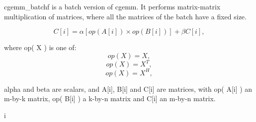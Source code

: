cgemm\+\_\+batchf is a batch version of cgemm. It performs matrix-\/matrix multiplication of matrices, where all the matrices of the batch have a fixed size.

\[ C[i] = \alpha [op( A[i] )\times op( B[i] )] + \beta C[i], \]

where op( X ) is one of\+: \[ op( X ) = X, \] \[ op( X ) = X^T, \] \[ op( X ) = X^H, \]

alpha and beta are scalars, and A\mbox{[}i\mbox{]}, B\mbox{[}i\mbox{]} and C\mbox{[}i\mbox{]} are matrices, with op( A\mbox{[}i\mbox{]} ) an m-\/by-\/k matrix, op( B\mbox{[}i\mbox{]} ) a k-\/by-\/n matrix and C\mbox{[}i\mbox{]} an m-\/by-\/n matrix. \begin{DoxyVerb}                                                                        i
\end{DoxyVerb}
 
